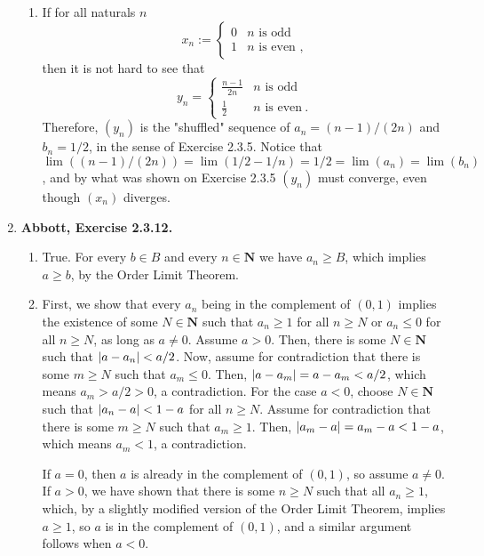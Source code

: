 \documentclass{article}
\DeclarePairedDelimiter\abs{\lvert}{\rvert}
\newcommand{\N}{\mathbf{N}}
\newcommand{\exc}[2][Abbott]{\item \textbf{#1, Exercise #2.}}
\begin{document}
\begin{enumerate}
\begin{enumerate}
		\item If for all naturals $n$ \begin{equation*}
		      x_n := \begin{cases}
		      0 & n \text{ is odd} \\
		      1 & n \text{ is even} \text{ ,}
		\end{cases}
		\end{equation*} then it is not hard to see that \begin{equation*}
		y_n = \begin{cases}
		\frac{n-1}{2n} & n \text{ is odd} \\
		\frac{1}{2} & n \text{ is even} ~ .
		\end{cases}
		\end{equation*} Therefore, $(y_n)$ is the "shuffled" sequence of $a_n = (n-1)/(2n)$ and $b_n = 1/2$, in the sense of Exercise 2.3.5. Notice that $\lim((n-1)/(2n)) = \lim(1/2 - 1/n) = 1/2 = \lim(a_n) = \lim(b_n)$, and by what was shown on Exercise 2.3.5 $(y_n)$ must converge, even though $(x_n)$ diverges.
	\end{enumerate}
				 
	\exc{2.3.12}
				 
	\begin{enumerate}
		\item True. For every $b \in B$ and every $n \in \N$ we have $a_n \geq B$, which implies $a \geq b$, by the Order Limit Theorem.
		      		      		      	     
		\item First, we show that every $a_n$ being in the complement of $(0, 1)$ implies the existence of some $N \in \N$ such that $a_n \geq 1$ for all $n \geq N$ or $a_n \leq 0$ for all $n \geq N$, as long as $a \neq 0$. Assume $a > 0$. Then, there is some $N \in \N$ such that $\abs*{a-a_n} < a/2$. Now, assume for contradiction that there is some $m \geq N$ such that $a_m \leq 0$. Then, $\abs*{a-a_m} = a-a_m < a/2$, which means $a_m > a/2 > 0$, a contradiction. For the case $a < 0$, choose $N \in \N$ such that $\abs*{a_n-a} < 1-a$ for all $n \geq N$. Assume for contradiction that there is some $m \geq N$ such that $a_m \geq 1$. Then, $\abs*{a_m-a} = a_m-a < 1-a$, which means $a_m < 1$, a contradiction. 
		      		      		      	     
		      If $a = 0$, then $a$ is already in the complement of $(0, 1)$, so assume $a \neq 0$. If $a > 0$, we have shown that there is some $n \geq N$ such that all $a_n \geq 1$, which, by a slightly modified version of the Order Limit Theorem, implies $a \geq 1$, so $a$ is in the complement of $(0, 1)$, and a similar argument follows when $a < 0$.
		      		      		      	     

\end{enumerate}
\end{enumerate}
\end{document}
